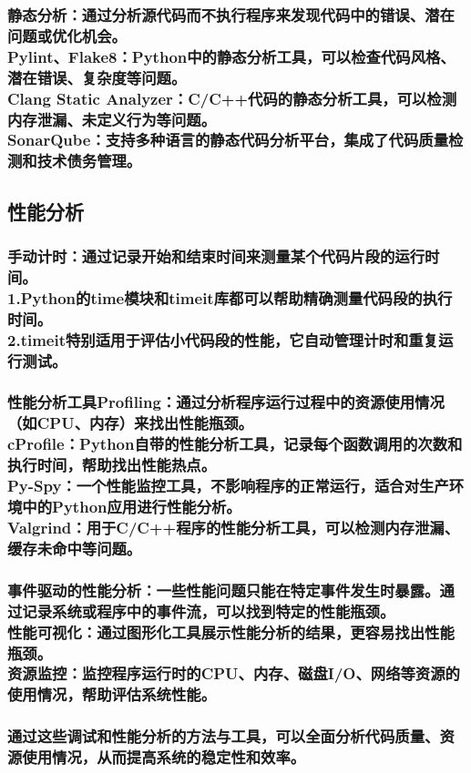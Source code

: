 \documentclass[UTF8,a4paper]{ctexart}
\begin{document}
\begin{sloppypar}
	\subsubsection{静态分析：通过分析源代码而不执行程序来发现代码中的错误、潜在问题或优化机会。\\Pylint、Flake8：Python中的静态分析工具，可以检查代码风格、潜在错误、复杂度等问题。\\Clang Static Analyzer：C/C++代码的静态分析工具，可以检测内存泄漏、未定义行为等问题。\\SonarQube：支持多种语言的静态代码分析平台，集成了代码质量检测和技术债务管理。}
	
	\newpage
	
	\subsection{性能分析}
	\subsubsection{手动计时：通过记录开始和结束时间来测量某个代码片段的运行时间。\\1.Python的time模块和timeit库都可以帮助精确测量代码段的执行时间。\\2.timeit特别适用于评估小代码段的性能，它自动管理计时和重复运行测试。}
	\subsubsection{性能分析工具Profiling：通过分析程序运行过程中的资源使用情况（如CPU、内存）来找出性能瓶颈。\\cProfile：Python自带的性能分析工具，记录每个函数调用的次数和执行时间，帮助找出性能热点。\\Py-Spy：一个性能监控工具，不影响程序的正常运行，适合对生产环境中的Python应用进行性能分析。\\Valgrind：用于C/C++程序的性能分析工具，可以检测内存泄漏、缓存未命中等问题。}
	\subsubsection{事件驱动的性能分析：一些性能问题只能在特定事件发生时暴露。通过记录系统或程序中的事件流，可以找到特定的性能瓶颈。\\性能可视化：通过图形化工具展示性能分析的结果，更容易找出性能瓶颈。\\资源监控：监控程序运行时的CPU、内存、磁盘I/O、网络等资源的使用情况，帮助评估系统性能。}
	\subsubsection{通过这些调试和性能分析的方法与工具，可以全面分析代码质量、资源使用情况，从而提高系统的稳定性和效率。}
	

\end{sloppypar}
\end{document}
